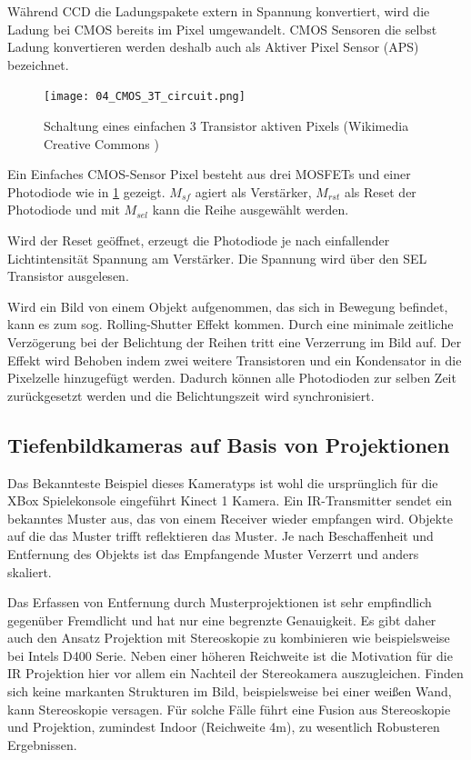   Während CCD die Ladungspakete extern in Spannung konvertiert, wird die Ladung bei CMOS bereits im Pixel umgewandelt. CMOS Sensoren die selbst Ladung konvertieren werden deshalb auch als Aktiver Pixel Sensor (APS) bezeichnet.

\begin{figure}[h!]
  \centering
  \texttt{[image: 04\_CMOS\_3T\_circuit.png]}
  \caption[3 Transistor CMOS Schaltung]{Schaltung eines einfachen 3 Transistor aktiven Pixels (Wikimedia Creative Commons \cite{Wikimedia})}
  \label{fig:cmos}
\end{figure}

  Ein Einfaches CMOS-Sensor Pixel besteht aus drei MOSFETs und einer Photodiode wie in \ref{fig:cmos} gezeigt. $M_{sf}$ agiert als Verstärker, $M_{rst}$ als Reset der Photodiode und mit $M_{sel}$ kann die Reihe ausgewählt werden.
  \newline

  Wird der Reset geöffnet, erzeugt die Photodiode je nach einfallender Lichtintensität Spannung am Verstärker. Die Spannung wird über den SEL Transistor ausgelesen. 
  \newline

  Wird ein Bild von einem Objekt aufgenommen, das sich in Bewegung befindet, kann es zum sog. Rolling-Shutter Effekt kommen. Durch eine minimale zeitliche Verzögerung bei der Belichtung der Reihen tritt eine Verzerrung im Bild auf. Der Effekt wird Behoben indem zwei weitere Transistoren und ein Kondensator in die Pixelzelle hinzugefügt werden. Dadurch können alle Photodioden zur selben Zeit zurückgesetzt werden und die Belichtungszeit wird synchronisiert.
    

\subsection{Tiefenbildkameras auf Basis von Projektionen}

Das Bekannteste Beispiel dieses Kameratyps ist wohl die ursprünglich für die XBox Spielekonsole eingeführt Kinect 1 Kamera. Ein IR-Transmitter sendet ein bekanntes Muster aus, das von einem Receiver wieder empfangen wird. Objekte auf die das Muster trifft reflektieren das Muster. Je nach Beschaffenheit und Entfernung des Objekts ist das Empfangende Muster Verzerrt und anders skaliert. 
\newline

Das Erfassen von Entfernung durch Musterprojektionen ist sehr empfindlich gegenüber Fremdlicht und hat nur eine begrenzte Genauigkeit. Es gibt daher auch den Ansatz Projektion mit Stereoskopie zu kombinieren wie beispielsweise bei Intels D400 Serie. Neben einer höheren Reichweite ist die Motivation für die IR Projektion hier vor allem ein Nachteil der Stereokamera auszugleichen. Finden sich keine markanten Strukturen im Bild, beispielsweise bei einer wei{\ss}en Wand, kann Stereoskopie versagen. Für solche Fälle führt eine Fusion aus Stereoskopie und Projektion, zumindest Indoor (Reichweite 4m), zu wesentlich Robusteren Ergebnissen. \cite{realsense}

